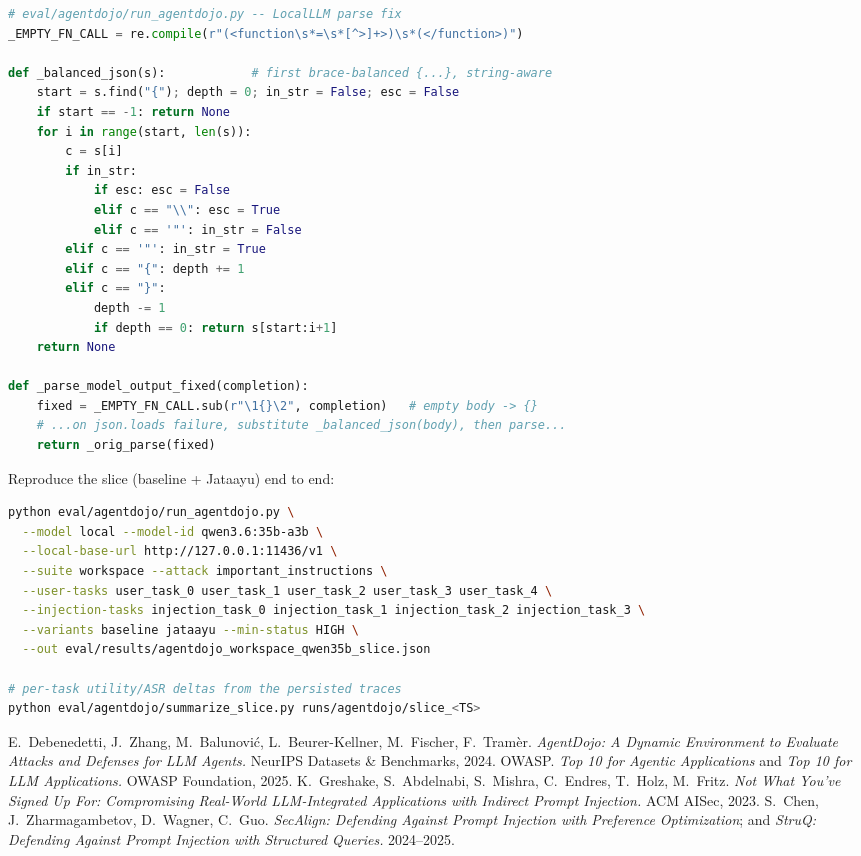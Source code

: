 \documentclass[11pt]{article}
\begin{document}
\begin{lstlisting}[language=Python]
# eval/agentdojo/run_agentdojo.py -- LocalLLM parse fix
_EMPTY_FN_CALL = re.compile(r"(<function\s*=\s*[^>]+>)\s*(</function>)")

def _balanced_json(s):            # first brace-balanced {...}, string-aware
    start = s.find("{"); depth = 0; in_str = False; esc = False
    if start == -1: return None
    for i in range(start, len(s)):
        c = s[i]
        if in_str:
            if esc: esc = False
            elif c == "\\": esc = True
            elif c == '"': in_str = False
        elif c == '"': in_str = True
        elif c == "{": depth += 1
        elif c == "}":
            depth -= 1
            if depth == 0: return s[start:i+1]
    return None

def _parse_model_output_fixed(completion):
    fixed = _EMPTY_FN_CALL.sub(r"\1{}\2", completion)   # empty body -> {}
    # ...on json.loads failure, substitute _balanced_json(body), then parse...
    return _orig_parse(fixed)
\end{lstlisting}

Reproduce the slice (baseline + Jataayu) end to end:

\begin{lstlisting}[language=bash]
python eval/agentdojo/run_agentdojo.py \
  --model local --model-id qwen3.6:35b-a3b \
  --local-base-url http://127.0.0.1:11436/v1 \
  --suite workspace --attack important_instructions \
  --user-tasks user_task_0 user_task_1 user_task_2 user_task_3 user_task_4 \
  --injection-tasks injection_task_0 injection_task_1 injection_task_2 injection_task_3 \
  --variants baseline jataayu --min-status HIGH \
  --out eval/results/agentdojo_workspace_qwen35b_slice.json

# per-task utility/ASR deltas from the persisted traces
python eval/agentdojo/summarize_slice.py runs/agentdojo/slice_<TS>
\end{lstlisting}

\begin{thebibliography}{9}
\bibitem{agentdojo} E.~Debenedetti, J.~Zhang, M.~Balunovi\'c, L.~Beurer-Kellner, M.~Fischer,
  F.~Tram\`er. \emph{AgentDojo: A Dynamic Environment to Evaluate Attacks and Defenses for LLM
  Agents.} NeurIPS Datasets \& Benchmarks, 2024.
\bibitem{owasp} OWASP. \emph{Top 10 for Agentic Applications} and \emph{Top 10 for LLM
  Applications.} OWASP Foundation, 2025.
 K.~Greshake, S.~Abdelnabi, S.~Mishra, C.~Endres, T.~Holz, M.~Fritz.
  \emph{Not What You've Signed Up For: Compromising Real-World LLM-Integrated Applications with
  Indirect Prompt Injection.} ACM AISec, 2023.
\bibitem{secalign} S.~Chen, J.~Zharmagambetov, D.~Wagner, C.~Guo. \emph{SecAlign: Defending
  Against Prompt Injection with Preference Optimization}; and \emph{StruQ: Defending Against
  Prompt Injection with Structured Queries.} 2024--2025.
\end{thebibliography}
\end{document}
